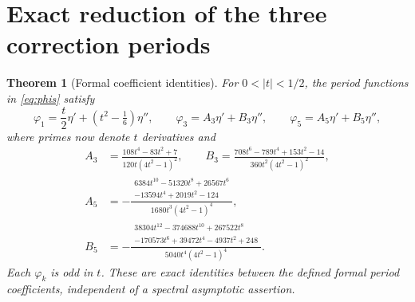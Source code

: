 \documentclass[10pt]{article}
\newtheorem{theorem}[proposition]{Theorem}
\newcommand{\ph}{\varphi}
\begin{document}
\section{Exact reduction of the three correction periods}
\begin{theorem}[Formal coefficient identities]
For $0<|t|<1/2$, the period functions in \eqref{eq:phis} satisfy
\begin{equation}
 \ph_1=\frac t2\eta'+(t^2-\tfrac16)\eta'',\qquad
 \ph_3=A_3\eta'+B_3\eta'',\qquad
 \ph_5=A_5\eta'+B_5\eta'',
 \label{eq:reduction}
\end{equation}
where primes now denote $t$ derivatives and
\begin{align}
 A_3&=\frac{108t^4-83t^2+7}{120t(4t^2-1)^2},\qquad
 B_3=\frac{708t^6-789t^4+153t^2-14}{360t^2(4t^2-1)^2},\label{eq:AB3}\\
 A_5&=-\frac{\begin{gathered}6384t^{10}-51320t^8+26567t^6\\[-2pt]-13594t^4+2019t^2-124\end{gathered}}
 {1680t^3(4t^2-1)^4},\label{eq:A5}\\
 B_5&=-\frac{\begin{gathered}38304t^{12}-374688t^{10}+267522t^8\\[-2pt]-170573t^6+39472t^4-4937t^2+248\end{gathered}}
 {5040t^4(4t^2-1)^4}.\label{eq:B5}
\end{align}
Each $\ph_k$ is odd in $t$. These are exact identities between the defined formal period coefficients, independent of a spectral asymptotic assertion.
\end{theorem}
\end{document}
